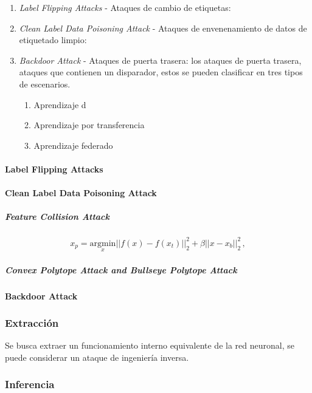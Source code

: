 
\begin{enumerate}
    \item \textit{Label Flipping Attacks} - Ataques de cambio de etiquetas:
    \item \textit{Clean Label Data Poisoning Attack} - Ataques de envenenamiento de datos de etiquetado limpio:
    \item \textit{Backdoor Attack} - Ataques de puerta trasera: los ataques de puerta trasera, ataques que contienen un disparador, estos se pueden clasificar en tres tipos de escenarios.
          \begin{enumerate}
              \item Aprendizaje d
              \item Aprendizaje por transferencia
              \item Aprendizaje federado
          \end{enumerate}
\end{enumerate}

\paragraph{Label Flipping Attacks}

\paragraph{Clean Label Data Poisoning Attack}

\subparagraph{Feature Collision Attack}
$$x_{p}={\underset{x}{\mathrm{argmin}}}||f\left(x\right)-f\left(x_{t}\right)||_{2}^{2}+\beta||x-x_{b}||_{2}^{2}\,,$$

\subparagraph{Convex Polytope Attack and Bullseye Polytope Attack}

\paragraph{Backdoor Attack}


\subsubsection{Extracción}

Se busca extraer un funcionamiento interno equivalente de la red neuronal, se puede considerar un ataque de ingeniería inversa.

% 
\subsubsection{Inferencia}

